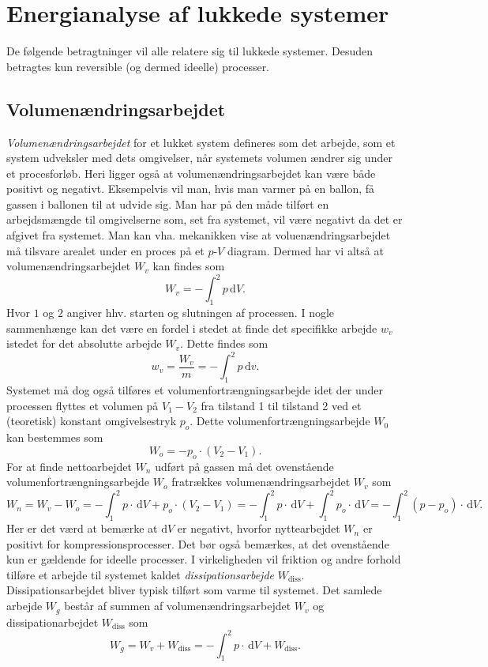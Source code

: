 
\section{Energianalyse af lukkede systemer}
De følgende betragtninger vil alle relatere sig til lukkede systemer. Desuden betragtes kun reversible (og dermed ideelle) processer. 

\subsection{Volumenændringsarbejdet}
\textit{Volumenændringsarbejdet} for et lukket system defineres som det arbejde, som et system udveksler med dets omgivelser, når systemets volumen ændrer sig under et procesforløb. Heri ligger også at volumenændringsarbejdet kan være både positivt og negativt. Eksempelvis vil man, hvis man varmer på en ballon, få gassen i ballonen til at udvide sig. Man har på den måde tilført en arbejdsmængde til omgivelserne som, set fra systemet, vil være negativt da det er afgivet fra systemet. Man kan vha. mekanikken vise at voluenændringsarbejdet må tilsvare arealet under en proces på et $p$-$V$ diagram. Dermed har vi altså at volumenændringsarbejdet $W_v$ kan findes som
\[ 
W_v = - \int_{1}^{2} p \, \mathrm{d}V
.\]
Hvor $1$ og $2$ angiver hhv. starten og slutningen af processen. I nogle sammenhænge kan det være en fordel i stedet at finde det specifikke arbejde $w_v$ istedet for det absolutte arbejde $W_v$. Dette findes som
\[ 
w_v = \frac{W_v}{m} = - \int_{1}^{2} p \, \mathrm{d}v
.\]
Systemet må dog også tilføres et volumenfortrængningsarbejde idet der under processen flyttes et volumen på $V_1 - V_2$ fra tilstand 1 til tilstand 2 ved et (teoretisk) konstant omgivelsestryk $p_o$. Dette volumenfortrængningsarbejde $W_0$ kan bestemmes som
\[ 
  W_o = - p_o \cdot \left( V_2 - V_1 \right)
.\]
For at finde nettoarbejdet $W_n$ udført på gassen må det ovenstående volumenfortrængningsarbejde $W_o$ fratrækkes volumenændringsarbejdet $W_v$ som
\[ 
W_n = W_v - W_o = - \int_{1}^{2} p \cdot \, \mathrm{d}V + p_o \cdot \left( V_2 - V_1 \right) = - \int_{1}^{2} p \cdot \, \mathrm{d}V + \int_{1}^{2} p_o \cdot \, \mathrm{d}V = - \int_{1}^{2} (p - p_o) \cdot \, \mathrm{d}V
.\]
Her er det værd at bemærke at $\mathrm{d}V$ er negativt, hvorfor nyttearbejdet $W_n$ er positivt for kompressionsprocesser. Det bør også bemærkes, at det ovenstående kun er gældende for ideelle processer. I virkeligheden vil friktion og andre forhold tilføre et arbejde til systemet kaldet \textit{dissipationsarbejde} $W_{\text{diss}}$. Dissipationsarbejdet bliver typisk tilført som varme til systemet. Det samlede arbejde $W_g$ består af summen af volumenændringsarbejdet $W_v$ og dissipationarbejdet $W_{\text{diss}}$ som
\[ 
W_g = W_v + W_{\text{diss}} = - \int_{1}^{2} p \cdot \, \mathrm{d}V + W_{\text{diss}}
.\]

